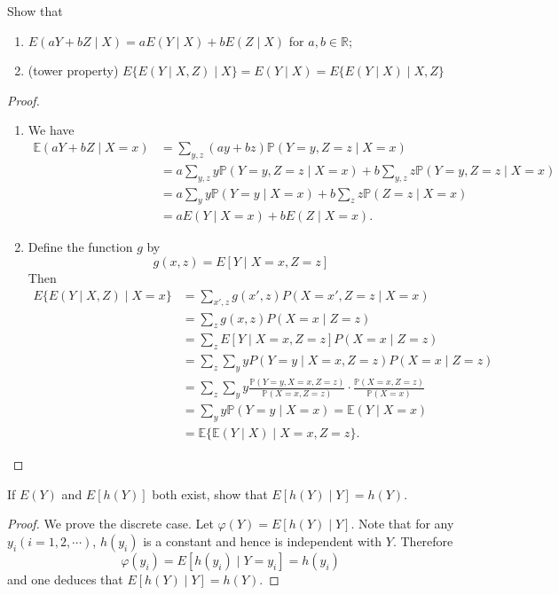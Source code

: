 \documentclass[11pt,singlecolumn, openany, citestyle=authoryear]{elegantbook}
\begin{document}
\begin{CJK}{UTF8}{gbsn}
\begin{exercise}
    Show that 
    \begin{enumerate}
    \item $E(aY + bZ \mid X) = aE(Y \mid X) + bE(Z \mid X)$ for $a, b \in \mathbb{R}$;
    \item (tower property) $E\{E(Y \mid X, Z) \mid X\} = E(Y \mid X) = E\{E(Y \mid X)\mid X,Z\}$
    \end{enumerate}
\end{exercise}
\begin{proof}
\begin{enumerate}
    \item 
    We have 
$$
\begin{aligned}
\mathbb{E}(a Y+b Z \mid X=x) & =\sum_{y, z}(a y+b z) \mathbb{P}(Y=y, Z=z \mid X=x) \\
& =a \sum_{y, z} y \mathbb{P}(Y=y, Z=z \mid X=x)+b \sum_{y, z} z \mathbb{P}(Y=y, Z=z \mid X=x) \\
& =a \sum_y y \mathbb{P}(Y=y \mid X=x)+b \sum_z z \mathbb{P}(Z=z \mid X=x)\\
& =aE(Y\mid X=x)+bE(Z\mid X=x). 
\end{aligned}
$$
    \item 
    Define the function $g$ by 
    $$
    g(x,z)=E[Y\mid X=x,Z=z]
    $$
    Then 
    \begin{align*}
        E\{E(Y\mid X,Z)\mid X=x\}&=
        \sum_{x',z} g(x',z)P(X=x',Z=z\mid X=x)\\
        &=\sum_z g(x,z)P(X=x\mid Z=z)\\
        &=\sum_z E[Y\mid X=x,Z=z] P(X=x\mid Z=z)\\
        &=\sum_z \sum_y y P(Y=y\mid X=x,Z=z)P(X=x\mid Z=z)\\
        &=\sum_z \sum_y y \frac{\mathbb{P}(Y=y, X=x, Z=z)}{\mathbb{P}(X=x, Z=z)} \cdot \frac{\mathbb{P}(X=x, Z=z)}{\mathbb{P}(X=x)} \\
        &=\sum_y y \mathbb{P}(Y=y \mid X=x)=\mathbb{E}(Y \mid X=x) \\
        &=\mathbb{E}\{\mathbb{E}(Y \mid X) \mid X=x, Z=z\}.
    \end{align*}
\end{enumerate}
\end{proof}

\begin{exercise}
    If $E(Y)$ and $E[h(Y)]$ both exist, show that $E[h(Y)\mid Y]=h(Y)$.
\end{exercise}
\begin{proof}
    We prove the discrete case. Let $\varphi(Y)=E[h(Y)\mid Y]$. Note that 
    for any $y_i (i=1,2,\cdots)$, $h(y_i)$ is a constant and hence is independent with 
    $Y$. Therefore
    $$
    \varphi(y_i)=E[h(y_i)\mid Y=y_i] = h(y_i)
    $$
    and one deduces that $E[h(Y)\mid Y]=h(Y)$.
\end{proof}


\end{CJK}
\end{document}
